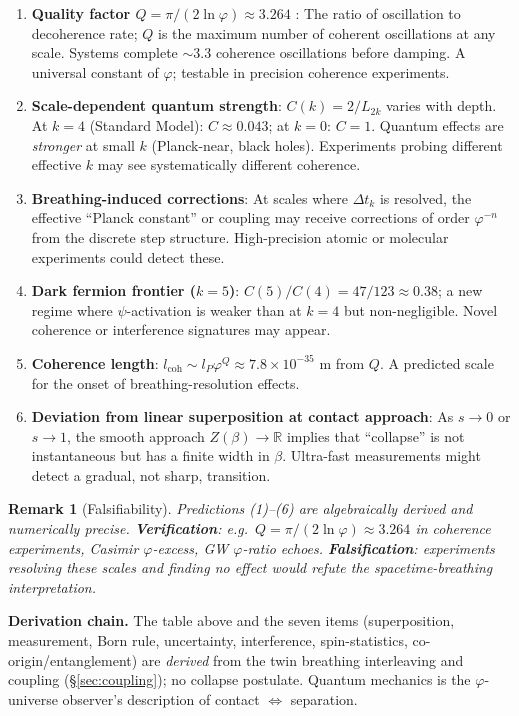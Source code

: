 \documentclass[12pt,a4paper]{article}
\newtheorem{remark}[theorem]{Remark}
\begin{document}
\begin{enumerate}[nosep]
\item \textbf{Quality factor $Q = \pi/(2\ln\varphi) \approx 3.264$} \label{thm:quality}: The ratio of oscillation to decoherence rate; $Q$ is the maximum number of coherent oscillations at any scale. Systems complete $\sim 3.3$ coherence oscillations before damping. A universal constant of $\varphi$; testable in precision coherence experiments.
\item \textbf{Scale-dependent quantum strength}: $C(k) = 2/L_{2k}$ varies with depth. At $k = 4$ (Standard Model): $C \approx 0.043$; at $k = 0$: $C = 1$. Quantum effects are \emph{stronger} at small $k$ (Planck-near, black holes). Experiments probing different effective $k$ may see systematically different coherence.
\item \textbf{Breathing-induced corrections}: At scales where $\Delta t_k$ is resolved, the effective ``Planck constant'' or coupling may receive corrections of order $\varphi^{-n}$ from the discrete step structure. High-precision atomic or molecular experiments could detect these.
\item \textbf{Dark fermion frontier ($k = 5$)}: $C(5)/C(4) = 47/123 \approx 0.38$; a new regime where $\psi$-activation is weaker than at $k = 4$ but non-negligible. Novel coherence or interference signatures may appear.
\item \textbf{Coherence length}: $l_{\mathrm{coh}} \sim l_P\varphi^Q \approx 7.8 \times 10^{-35}$ m from $Q$. A predicted scale for the onset of breathing-resolution effects.
\item \textbf{Deviation from linear superposition at contact approach}: As $s \to 0$ or $s \to 1$, the smooth approach $Z(\beta) \to \mathbb{R}$ implies that ``collapse'' is not instantaneous but has a finite width in $\beta$. Ultra-fast measurements might detect a gradual, not sharp, transition.
\end{enumerate}

\begin{remark}[Falsifiability]
Predictions (1)--(6) are algebraically derived and numerically precise. \textbf{Verification}: e.g.\ $Q = \pi/(2\ln\varphi) \approx 3.264$ in coherence experiments, Casimir $\varphi$-excess, GW $\varphi$-ratio echoes. \textbf{Falsification}: experiments resolving these scales and finding no effect would refute the spacetime-breathing interpretation.
\end{remark}

\medskip
\noindent\textbf{Derivation chain.} The table above and the seven items (superposition, measurement, Born rule, uncertainty, interference, spin-statistics, co-origin/entanglement) are \emph{derived} from the twin breathing interleaving and coupling (\S\ref{sec:coupling}); no collapse postulate. Quantum mechanics is the $\varphi$-universe observer's description of contact $\Leftrightarrow$ separation.
\end{document}
